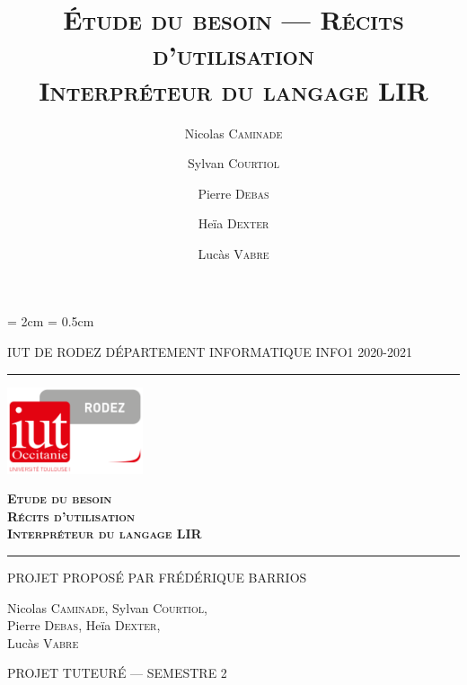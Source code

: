 \pagestyle{fancy}

\title{\textsc{\textbf{Étude du besoin --- Récits d'utilisation
                       \\Interpréteur du langage LIR}}}
\date{}
\author{Nicolas \textsc{Caminade} \and Sylvan \textsc{Courtiol} \and
    Pierre \textsc{Debas} \and Heïa \textsc{Dexter} \and Lucàs
    \textsc{Vabre} }
%
    \lhead{\leftmark}

    \cfoot{\thepage}
    \headheight = 2cm
    \headsep = 0.5cm

    \begin{titlepage}
        \selectfont

        \begin{center}\normalsize
            \MakeUppercase{IUT de Rodez \hfill Département informatique
                \hfill INFO1 2020-2021}
        \end{center}
        \vspace*{0.1cm}
        \hrule
        \vspace*{0.2cm}
        \begin{flushright}
            \includegraphics[width=4cm]{./img/logoiut}
        \end{flushright}
        \vspace*{2cm}
        \begin{flushright}\Huge
            \textsc{\textbf{Etude du besoin \\ Récits d'utilisation
                    \\Interpréteur du langage LIR}}
        \end{flushright}
        \hrule
        \begin{flushleft}
            \MakeUppercase{Projet proposé par Frédérique Barrios}
        \end{flushleft}
        \vspace*{2cm}
        \begin{center}\Large
            Nicolas \textsc{Caminade}, Sylvan \textsc{Courtiol},\\
            Pierre \textsc{Debas}, Heïa \textsc{Dexter}, \\
            Lucàs \textsc{Vabre}
        \end{center}
        \vfill
        \begin{center}\normalsize
            \MakeUppercase{Projet tuteuré --- Semestre 2}
        \end{center}
    \end{titlepage}

